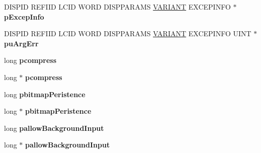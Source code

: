 \begin{DoxyCompactItemize}
\item 
\mbox{\label{struct_i_ms_tsc_advanced_settings_vtbl_ad37656b2b566a2973309c27a2a1c59a0}} 
D\+I\+S\+P\+ID R\+E\+F\+I\+ID L\+C\+ID W\+O\+RD D\+I\+S\+P\+P\+A\+R\+A\+MS \hyperlink{structtag_v_a_r_i_a_n_t}{V\+A\+R\+I\+A\+NT} E\+X\+C\+E\+P\+I\+N\+FO $\ast$ {\bfseries p\+Excep\+Info}
\item 
\mbox{\label{struct_i_ms_tsc_advanced_settings_vtbl_a15114729268f9d63145d19942b0389f2}} 
D\+I\+S\+P\+ID R\+E\+F\+I\+ID L\+C\+ID W\+O\+RD D\+I\+S\+P\+P\+A\+R\+A\+MS \hyperlink{structtag_v_a_r_i_a_n_t}{V\+A\+R\+I\+A\+NT} E\+X\+C\+E\+P\+I\+N\+FO U\+I\+NT $\ast$ {\bfseries pu\+Arg\+Err}
\item 
\mbox{\label{struct_i_ms_tsc_advanced_settings_vtbl_aaee6e6836b64cfee967e1294d48dda85}} 
long {\bfseries pcompress}
\item 
\mbox{\label{struct_i_ms_tsc_advanced_settings_vtbl_a0772f861d9984b0cf5d3051c0e384ea6}} 
long $\ast$ {\bfseries pcompress}
\item 
\mbox{\label{struct_i_ms_tsc_advanced_settings_vtbl_a7ff5543d6f7cf1e6f46e82df7a821aab}} 
long {\bfseries pbitmap\+Peristence}
\item 
\mbox{\label{struct_i_ms_tsc_advanced_settings_vtbl_a9b69416b3ddb96f839bb44efe718fb74}} 
long $\ast$ {\bfseries pbitmap\+Peristence}
\item 
\mbox{\label{struct_i_ms_tsc_advanced_settings_vtbl_a75296fcd276b82d0c0b04f42701ecd38}} 
long {\bfseries pallow\+Background\+Input}
\item 
\mbox{\label{struct_i_ms_tsc_advanced_settings_vtbl_a0d1f70f81aaf48db5758c6fac4f642c0}} 
long $\ast$ {\bfseries pallow\+Background\+Input}
\item 
\mbox{\label{struct_i_ms_tsc_advanced_settings_vtbl_a3254a14c5c185d2cc8a5d66bab4492bd}} 

\end{DoxyCompactItemize}

